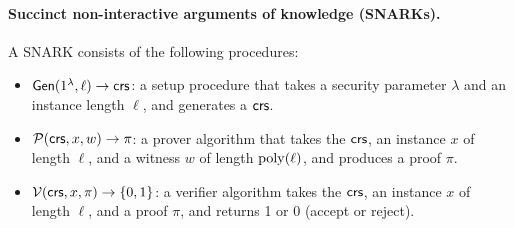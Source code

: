 \paragraph{Succinct non-interactive arguments of knowledge (SNARKs).}
A SNARK consists of the following procedures:
\begin{itemize}
	\item $\mathsf{Gen}(1^\lambda, \ell)\to \mathsf{crs}$: a setup procedure that takes a security parameter $\lambda$
		and an instance length $\ell$, and generates a $\mathsf{crs}$.
	\item $\mathcal{P}(\mathsf{crs}, x, w)\to \pi$: a prover algorithm that takes the $\mathsf{crs}$, an instance $x$ of length $\ell$,
		and a witness $w$ of length $\operatorname{poly}(\ell)$,
		and produces a proof $\pi$.
	\item $\mathcal{V}(\mathsf{crs}, x, \pi)\to \left \{{0,1} \right \}$: a verifier algorithm takes the $\mathsf{crs}$, an instance $x$ of length $\ell$,
		and a proof $\pi$, and returns 1 or 0 (accept or reject).
\end{itemize}

